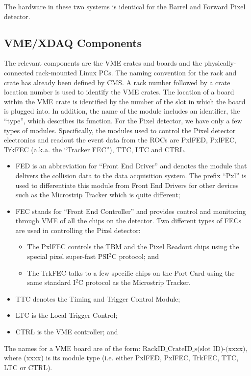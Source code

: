 \documentclass{cmspaper}
\begin{document}
The hardware in these two systems is identical for the Barrel and
Forward Pixel detector.


\subsection{VME/XDAQ Components}

The relevant components are the VME crates and boards 
and the physically-connected rack-mounted Linux PCs. 
The naming convention for the rack and crate has already been defined by CMS.
A rack number followed by a crate location number is used to identify the VME 
crates. The location of a board within the VME crate is identified by the 
number of the slot in which the board is plugged into.
In addition, the name of the module includes an identifier, the ``type'', which describes its function.
For the Pixel detector, we have only a few types of modules.
Specifically, the modules used to control the Pixel detector electronics 
and readout the event data from the ROCs are PxlFED, PxlFEC, TrkFEC 
(a.k.a. the ``Tracker FEC''), TTC, LTC and CTRL.

\begin{itemize}
\item FED is an abbreviation for ``Front End Driver'' and denotes the module that
delivers the collision data to the data acquisition system. The prefix
``Pxl'' is used to differentiate this module from Front End Drivers for
other devices such as the Microstrip Tracker which is quite different; 
\item FEC stands for 
``Front End Controller'' and provides control and monitoring through VME of
all the chips on the detector. Two different types of FECs are used in controlling the Pixel detector:
\begin{itemize}
\item The PxlFEC controls the TBM and the Pixel 
Readout chips using the special pixel super-fast PSI$^{2}$C protocol; and 
\item The TrkFEC talks to a few specific chips on the Port Card
using the same standard I$^{2}$C protocol as the Microstrip Tracker.
\end{itemize}
\item TTC denotes the Timing and Trigger Control Module;
\item LTC is the Local Trigger Control;
\item CTRL is the VME controller; and 
\end{itemize}

The names for a VME board are of the form:
$\mbox{RackID\_CrateID\_s(slot ID)-(xxxx),}$
where (xxxx) is its module type 
(i.e. either PxlFED, PxlFEC, TrkFEC, TTC, LTC or CTRL). 
\end{document}
